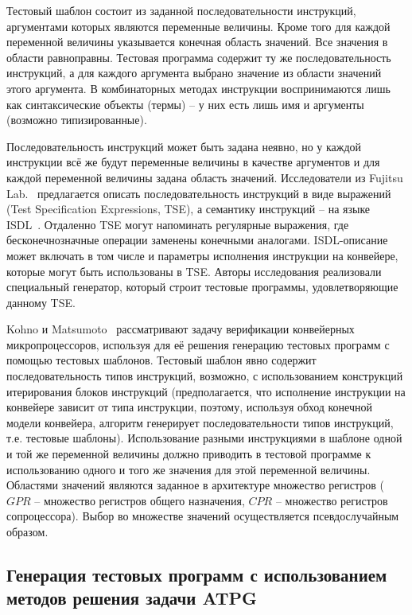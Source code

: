 Тестовый шаблон состоит из заданной последовательности инструкций,
аргументами которых являются переменные величины. Кроме того для
каждой переменной величины указывается конечная область значений.
Все значения в области равноправны. Тестовая программа содержит ту
же последовательность инструкций, а для каждого аргумента выбрано
значение из области значений этого аргумента. В комбинаторных
методах инструкции воспринимаются лишь как синтаксические объекты
(термы) -- у них есть лишь имя и аргументы (возможно
типизированные).

Последовательность инструкций может быть задана неявно, но у каждой
инструкции всё же будут переменные величины в качестве аргументов и
для каждой переменной величины задана область значений.
Исследователи из Fujitsu Lab.~\cite{TSE} предлагается описать
последовательность инструкций в виде выражений (Test Specification
Expressions, TSE), а семантику инструкций -- на языке
ISDL~\cite{ISDL}. Отдаленно TSE могут напоминать регулярные
выражения, где бесконечнозначные операции заменены конечными
аналогами. ISDL-описание может включать в том числе и параметры
исполнения инструкции на конвейере, которые могут быть использованы
в TSE. Авторы исследования реализовали специальный генератор,
который строит тестовые программы, удовлетворяющие данному TSE.

Kohno и Matsumoto~\cite{mVpGen} рассматривают задачу верификации
конвейерных микропроцессоров, используя для её решения генерацию
тестовых программ с помощью тестовых шаблонов. Тестовый шаблон явно
содержит последовательность типов инструкций, возможно, с
использованием конструкций итерирования блоков инструкций
(предполагается, что исполнение инструкции на конвейере зависит от
типа инструкции, поэтому, используя обход конечной модели конвейера,
алгоритм генерирует последовательности типов инструкций, т.е.
тестовые шаблоны). Использование разными инструкциями в шаблоне
одной и той же переменной величины должно приводить в тестовой
программе к использованию одного и того же значения для этой
переменной величины. Областями значений являются заданное в
архитектуре множество регистров ($GPR$ -- множество регистров общего
назначения, $CPR$ -- множество регистров сопроцессора). Выбор во
множестве значений осуществляется псевдослучайным образом.


\subsection{Генерация тестовых программ с использованием методов
решения задачи ATPG}

